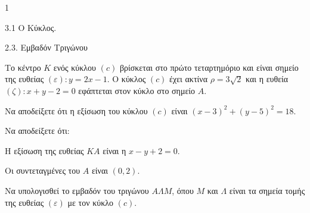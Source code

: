 \begin{ylh}{1}
    \item 3.1 Ο Κύκλος.
    \item 2.3. Εμβαδόν Τριγώνου
\end{ylh}
Το κέντρο $K$ ενός κύκλου $(c)$ βρίσκεται στο πρώτο τεταρτημόριο και είναι σημείο της ευθείας $(\varepsilon): y=2x-1$. Ο κύκλος $(c)$ έχει ακτίνα $\rho=3\sqrt{2}$ και η ευθεία $(\zeta): x+y-2=0$ εφάπτεται στον κύκλο στο σημείο $A$.
\begin{alist}
\item Να αποδείξετε ότι η εξίσωση του κύκλου $(c)$ είναι $(x-3)^2 + (y-5)^2 = 18$. 
\item Να αποδείξετε ότι:
    \begin{rlist}
    \item Η εξίσωση της ευθείας $KA$ είναι η $x-y+2=0$. 
    \item Οι συντεταγμένες του $A$ είναι $(0,2)$. 
    \end{rlist}
\item Να υπολογισθεί το εμβαδόν του τριγώνου $A\Lambda M$, όπου $M$ και $\Lambda$ είναι τα σημεία τομής της ευθείας $(\varepsilon)$ με τον κύκλο $(c)$. 
\end{alist}